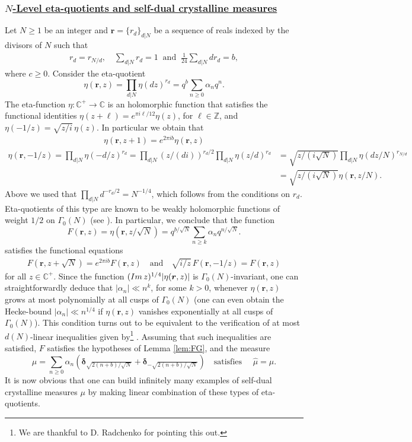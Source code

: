 \documentclass[a4paper,reqno,12pt]{amsart}
\renewcommand{\H}{\mathbb{C}^+}
\newcommand{\z}{\mathbb{Z}}
\newcommand{\cp}{\mathbb{C}} %
\newcommand{\im}{{\rm Im}\,}
\newcommand{\ft}{\widehat}
\newcommand{\bo}{\boldsymbol}
\newcommand{\br}{{\bo r}}
\newcommand{\al}{\alpha}
\newcommand{\1}{{\bf 1}}
\renewcommand{\1}{{\bo 1}}
\newcommand{\del}{{\bo \delta}}
\begin{document}
\subsubsection{\underline{$N$-Level eta-quotients and self-dual crystalline measures}}  Let $N\geq 1$ be an integer and $\br = \{r_d\}_{d|N}$ be a sequence of reals indexed by the divisors of $N$ such that
\begin{align}\label{eq:rcond}
r_d=r_{N/d}, \quad \sum_{d|N}r_d = 1 \ \text{ and } \  \frac{1}{24}\sum_{d|N}dr_d = b,
\end{align} 
where $c\geq 0$. Consider the eta-quotient
$$
\eta(\br,z) = \prod_{d|N} \eta(dz)^{r_d} = q^{b}\sum_{n\geq 0}\al_n q^{n}.
$$
The eta-function $\eta:\H\to\cp$ is an holomorphic function that satisfies the functional identities $\eta(z+\ell)=e^{\pi i  \ell /12}\eta(z)$, for $\ell\in\z$, and $\eta(-1/z)=\sqrt{z/i}\, \eta(z)$. In particular we obtain that 
\begin{align*}
\eta(\br,z+1) = e^{2\pi i b}\eta(\br,z)
\end{align*}
\begin{align*}
\eta(\br,-1/z) = \prod_{d|N} \eta(-d/z)^{r_d} = \prod_{d|N}(z/(di))^{r_d/2} \prod_{d|N} \eta(z/d)^{r_d} & = \sqrt{z/(i\sqrt{N})} \prod_{d|N} \eta(dz/N)^{r_{N/d}} \\
& = \sqrt{z/(i\sqrt{N})}\eta(\br,z/N).
\end{align*}
Above we used that $\prod_{d|N}d^{-r_d/2}=N^{-1/4}$, which follows from the conditions on $r_d$. Eta-quotients of this type are known to be weakly holomorphic functions of weight $1/2$ on $\Gamma_0(N)$ (see \cite[Prop. 1.39]{Bh}). In particular, we conclude that the function
$$
F(\br,z)=\eta(\br,z/\sqrt{N}) = q^{b/\sqrt{N}}\sum_{n\geq  k}\al_n q^{n/\sqrt{N}}.
$$
satisfies the functional equations 
\begin{align*}
F(\br,z+\sqrt{N})=e^{2\pi i b}F(\br,z) \quad \text{and} \quad
\sqrt{i/z}\,F(\br,-1/z)=F(\br,z)
\end{align*}
for all $z\in \H$. 
Since the function $(\im z)^{1/4} |\eta(\br,z)|$ is $\Gamma_0(N)$-invariant, one can straightforwardly deduce that $|\al_n| \ll n^k$, for some $k>0$, whenever $\eta(\br,z)$ grows at most polynomially at all cusps of $\Gamma_0(N)$ (one can even obtain the Hecke-bound $|\al_n| \ll n^{1/4}$ if $\eta(\br,z)$ vanishes exponentially at all cusps of $\Gamma_0(N)$). This condition turns out to be equivalent to the verification of at most $d(N)$-linear inequalities given by\footnote{We are thankful to D. Radchenko for pointing this out.} \cite[Lemma 1.40]{Bh}. Assuming that such inequalities are satisfied, $F$ satisfies the hypotheses of Lemma \ref{lem:FG}, and the measure
$$
\mu = \sum_{n\geq 0}\al_n (\del_{\sqrt{2(n+b)/\sqrt{N}}} + \del_{-\sqrt{2(n+b)/\sqrt{N}}}) \quad \text{satisfies } \quad \ft \mu=\mu.
$$
It is now obvious that one can build infinitely many examples of self-dual crystalline measures $\mu$ by making linear combination of these types of eta-quotients. 
\end{document}
